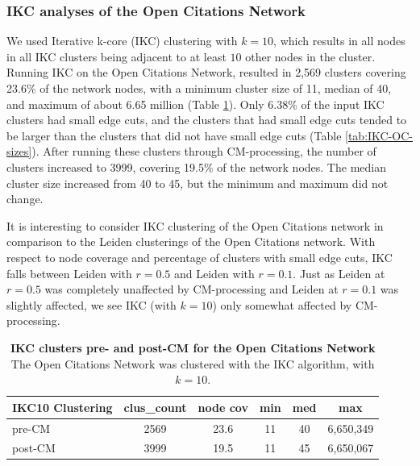 \documentclass[11pt]{article}   	%
\begin{document}
\subsubsection{IKC analyses of the Open Citations Network}

We used Iterative k-core (IKC) clustering with $k=10$, which results in all nodes in all  IKC clusters being adjacent to at least $10$ other nodes in the cluster. Running IKC on the Open Citations Network, resulted in 2,569 clusters
covering 23.6\% of the network nodes, with a minimum cluster size of 11, median of 40, and maximum of about 6.65 million (Table \ref{tab:IKC-11-OC-basicstats}).  Only 6.38\% of the input IKC clusters had small edge cuts, and the clusters that had small edge cuts tended to be larger than the clusters that did not have small edge cuts  (Table \ref{tab:IKC-OC-sizes}).
After running these clusters through CM-processing, the number of clusters increased to 3999, covering 19.5\% of the network nodes. The  median cluster size increased from 40 to 45, but the minimum and maximum did not change.

It is interesting to consider IKC clustering of the Open Citations  network in comparison to the Leiden clusterings of the Open Citations network.
With respect to node coverage and percentage of clusters with small edge cuts, IKC falls between Leiden with $r=0.5$ and Leiden with $r=0.1$.
Just as Leiden at $r=0.5$ was completely unaffected by CM-processing and Leiden at $r=0.1$ was slightly affected,
we see IKC (with $k=10$) only somewhat affected by CM-processing.




\begin{table}[ht]
\centering
\begin{tabular}{lccccc}
  \hline
  IKC10 Clustering & clus\_count & node cov & min & med & max       \\ \hline
  pre-CM     & 2569       & 23.6     & 11  & 40  & 6,650,349 \\
  post-CM & 3999 & 19.5 & 11 & 45 & 6,650,067\\
  \hline
\end{tabular}
\caption[IKC clusters pre- and post-CM for the Open Citations Network]{\textbf{IKC clusters pre- and post-CM for the Open Citations Network} The Open Citations Network was clustered with the IKC algorithm, with $k=10$.
}
\label{tab:IKC-11-OC-basicstats}
\end{table}
\end{document}
